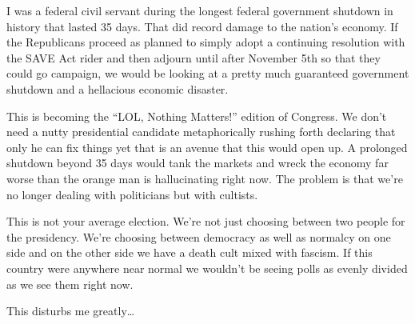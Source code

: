 I was a federal civil servant during the longest federal government
shutdown in history that lasted 35 days. That did record damage to the
nation's economy. If the Republicans proceed as planned to simply adopt
a continuing resolution with the SAVE Act rider and then adjourn until
after November 5th so that they could go campaign, we would be looking
at a pretty much guaranteed government shutdown and a hellacious
economic disaster.

This is becoming the ``LOL, Nothing Matters!'' edition of Congress. We
don't need a nutty presidential candidate metaphorically rushing forth
declaring that only he can fix things yet that is an avenue that this
would open up. A prolonged shutdown beyond 35 days would tank the
markets and wreck the economy far worse than the orange man is
hallucinating right now. The problem is that we're no longer dealing
with politicians but with cultists.

This is not your average election. We're not just choosing between two
people for the presidency. We're choosing between democracy as well as
normalcy on one side and on the other side we have a death cult mixed
with fascism. If this country were anywhere near normal we wouldn't be
seeing polls as evenly divided as we see them right now.

This disturbs me greatly\ldots{}
